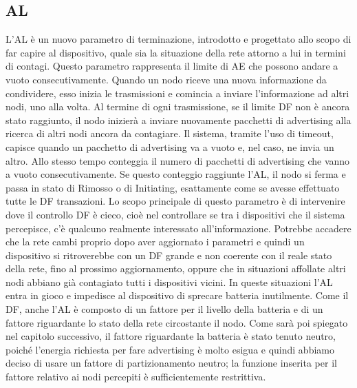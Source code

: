 \subsection{\acf{AL}}
L'\acf{AL} è un nuovo parametro di terminazione, introdotto e progettato allo scopo di far capire al dispositivo, quale sia la situazione della rete attorno a lui in termini di contagi. Questo parametro rappresenta il limite di \acf{AE} che possono andare a vuoto consecutivamente. Quando un nodo riceve una nuova informazione da condividere, esso inizia le trasmissioni e comincia a inviare l'informazione ad altri nodi, uno alla volta. Al termine di ogni trasmissione, se il limite \acs{DF} non è ancora stato raggiunto, il nodo inizierà a inviare nuovamente pacchetti di advertising alla ricerca di altri nodi ancora da contagiare. Il sistema, tramite l'uso di timeout, capisce quando un pacchetto di advertising va a vuoto e, nel caso, ne invia un altro. Allo stesso tempo conteggia il numero di pacchetti di advertising che vanno a vuoto consecutivamente. Se questo conteggio raggiunte l'\acs{AL}, il nodo si ferma e passa in stato di Rimosso o di Initiating, esattamente come se avesse effettuato tutte le \acs{DF} transazioni. Lo scopo principale di questo parametro è di intervenire dove il controllo \acs{DF} è cieco, cioè nel controllare se tra i dispositivi che il sistema percepisce, c'è qualcuno realmente interessato all'informazione. Potrebbe accadere che la rete cambi proprio dopo aver aggiornato i parametri e quindi un dispositivo si ritroverebbe con un \acs{DF} grande e non coerente con il reale stato della rete, fino al prossimo aggiornamento, oppure che in situazioni affollate altri nodi abbiano già contagiato tutti i dispositivi vicini. In queste situazioni l'\acs{AL} entra in gioco e impedisce al dispositivo di sprecare batteria inutilmente.
Come il \acs{DF}, anche l'\acs{AL} è composto di un fattore per il livello della batteria e di un fattore riguardante lo stato della rete circostante il nodo. Come sarà poi spiegato nel capitolo successivo, il fattore riguardante la batteria è stato tenuto neutro, poiché l'energia richiesta per fare advertising è molto esigua e quindi abbiamo deciso di usare un fattore di partizionamento neutro; la funzione inserita per il fattore relativo ai nodi percepiti è sufficientemente restrittiva.

